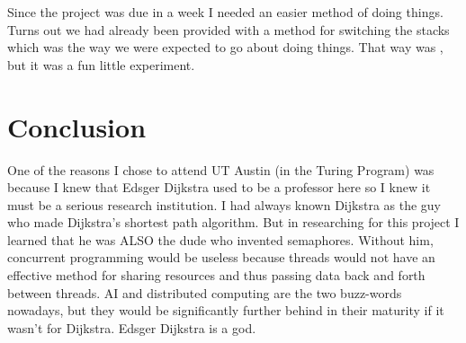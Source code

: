 \documentclass[12pt]{article}
\begin{document}
    Since the project was due in a week I needed an easier method of doing things. Turns out we had already been provided with a method for switching the stacks which was the way we were expected to go about doing things. That way was , but it was a fun little experiment.

  \section{Conclusion}

    One of the reasons I chose to attend UT Austin (in the Turing Program) was because I knew that Edsger Dijkstra used to be a professor here so I knew it must be a serious research institution. I had always known Dijkstra as the guy who made Dijkstra's shortest path algorithm. But in researching for this project I learned that he was ALSO the dude who invented semaphores. Without him, concurrent programming would be useless because threads would not have an effective method for sharing resources and thus passing data back and forth between threads. AI and distributed computing are the two buzz-words nowadays, but they would be significantly further behind in their maturity if it wasn't for Dijkstra.
    Edsger Dijkstra is a god. 
      
\end{document}
